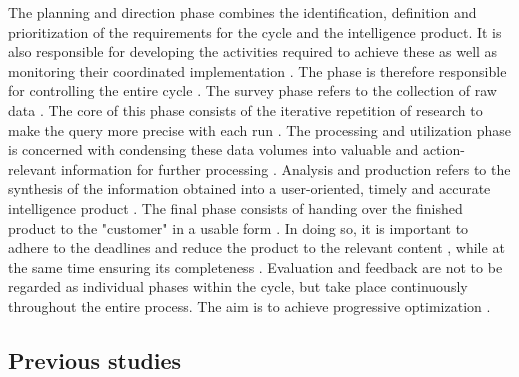 \documentclass[10pt]{article}
\begin{document}
The planning and direction phase combines the identification, definition and prioritization of the requirements for the cycle and the intelligence product. It is also responsible for developing the activities required to achieve these \cite{DepartmentoftheArmy.2012} as well as monitoring their coordinated implementation \cite{JointChiefsofStaffU.S.Army.2013,DepartmentoftheArmy.2012}. The phase is therefore responsible for controlling the entire cycle \cite{CentralIntelligenceAgency.1987}. The survey phase refers to the collection of raw data \cite{CentralIntelligenceAgency.1987}. The core of this phase consists of the iterative repetition of research \cite{NorthAtlanticTreatyOrganization.2001} to make the query more precise with each run \cite{PastorGalindo.2020}. The processing and utilization phase is concerned with condensing these data volumes into valuable and action-relevant information for further processing \cite{DirectorofNationalIntelligence.2011,JointChiefsofStaffU.S.Army.2013,PastorGalindo.2020, }. Analysis and production refers to the synthesis of the information obtained into a user-oriented, timely and accurate intelligence product \cite{DepartmentoftheArmy.2012,Hwang.2022, NorthAtlanticTreatyOrganization.2001}. The final phase consists of handing over the finished product to the "customer" in a usable form \cite{CentralIntelligenceAgency.2023, DepartmentoftheArmy.2012, Williams.2018}. In doing so, it is important to adhere to the deadlines and reduce the product to the relevant content \cite{DepartmentoftheArmy.2012}, while at the same time ensuring its completeness \cite{Lowenthal.2020}. Evaluation and feedback are not to be regarded as individual phases within the cycle, but take place continuously throughout the entire process. The aim is to achieve progressive optimization \cite{DirectorofNationalIntelligence.2011,JointChiefsofStaffU.S.Army.2013,NorthAtlanticTreatyOrganization.2001}.

\subsection{Previous studies}
\end{document}
